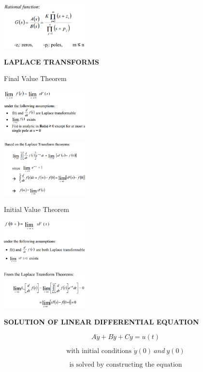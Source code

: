 \documentclass[a0,landscape]{article}
\date{}
\begin{document}
\begin{multicols}{3}
\includegraphics[width=1.77165in,height=0.95669in]{media/image1.png}

\textbf{LAPLACE TRANSFORMS}

Final Value Theorem

\includegraphics[width=1.77165in,height=0.92126in]{media/image2.png}

\includegraphics[width=1.77165in,height=1.14961in]{media/image3.png}

Initial Value Theorem

\includegraphics[width=1.77165in,height=0.90551in]{media/image4.png}

\includegraphics[width=1.77165in,height=0.77953in]{media/image5.png}

\textbf{SOLUTION OF LINEAR DIFFERENTIAL EQUATION}

\[A\ddot{y} + B\dot{y} + Cy = u\left( t \right)\]

\[\text{with\ initial\ conditions\ }\dot{y}\left( 0 \right)\ and\ y(0)\]

\[\text{is\ solved\ by\ constructing\ the\ equation}\]


\end{multicols}
\end{document}
